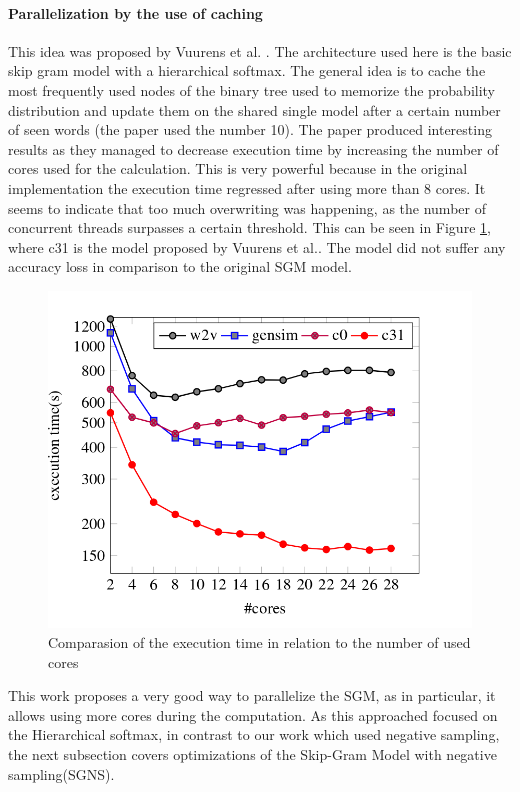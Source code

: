 \paragraph{Parallelization by the use of caching}
This idea was proposed by Vuurens et al. \cite{efficient}. The architecture used here is the basic skip gram model with a hierarchical softmax. The general idea is to cache the most frequently used nodes of the binary tree used to memorize the probability distribution and update them on the shared single model after a certain number of seen words (the paper used the number 10). The paper produced interesting results as they managed to decrease execution time by increasing the number of cores used for the calculation. This is very powerful because in the original implementation the execution time regressed after using more than 8 cores. It seems to indicate that too much overwriting was happening, as the number of concurrent threads surpasses a certain threshold. This can be seen in Figure \ref{fig:efficient}, where c31 is the model proposed by Vuurens et al.\cite{efficient}. The model did not suffer any accuracy loss in comparison to the original SGM model.
\begin{figure}[ht]
\centering
\includegraphics[scale=0.3]{images/cachingEfficiency.png}
\caption{Comparasion of the execution time in relation to the number of used cores \cite{efficient}}
\label{fig:efficient}
\end{figure}
This work proposes a very good way to parallelize the SGM, as in particular, it allows using more cores during the computation. As this approached focused on the Hierarchical softmax, in contrast to our work which used negative sampling, the next subsection covers optimizations of the Skip-Gram Model with negative sampling(SGNS).

